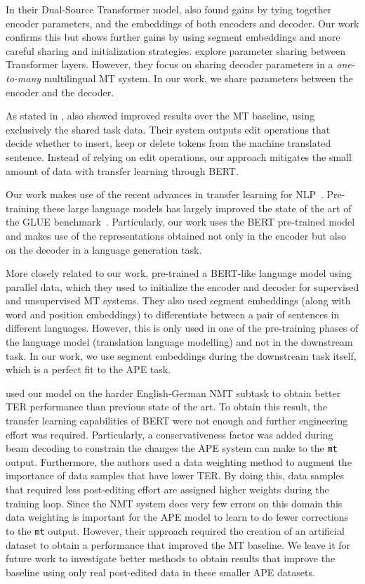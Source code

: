 In their Dual-Source Transformer model, \citet{junczys2018ms} also
found gains by tying together encoder parameters, and the embeddings
of both encoders and decoder. Our work confirms this but shows
further gains by using segment embeddings and more careful sharing
and initialization strategies. \citet{sachan2018parameter} explore
parameter sharing between Transformer layers. However, they focus on
sharing decoder parameters in a \emph{one-to-many} multilingual MT
system. In our work, we share parameters between the encoder and the
decoder.

As stated in , \citet{berard2017lig} also
showed improved results over the MT baseline, using exclusively the
shared task data. Their system outputs edit operations that decide
whether to insert, keep or delete tokens from the machine translated
sentence. Instead of relying on edit operations, our approach
mitigates the small amount of data with transfer learning through
BERT.

Our work makes use of the recent advances in transfer learning for
NLP~\citep{peters2018deep, howard2018universal, radford2018improving,
  devlin2018bert}. Pre-training these large language models has largely
improved the state of the art of the GLUE
benchmark~\citep{wang2018glue}. Particularly, our work uses the BERT
pre-trained model and makes use of the representations obtained not
only in the encoder but also on the decoder in a language generation
task.

More closely related to our work, \citet{lample2019cross}
pre-trained a BERT-like language model using parallel data, which
they used to initialize the encoder and decoder for supervised and
unsupervised MT systems. They also used segment embeddings (along
with word and position embeddings) to differentiate between a pair of
sentences in different languages. However, this is only used in one
of the pre-training phases of the language model (translation
language modelling) and not in the downstream task. In our work, we
use segment embeddings during the downstream task itself, which is a
perfect fit to the APE task.

\citet{lopes2019unbabels} used our model on the harder
English-German NMT subtask to obtain better TER performance than
previous state of the art. To obtain this result, the transfer
learning capabilities of BERT were not enough and further engineering
effort was required. Particularly, a conservativeness factor was
added during beam decoding to constrain the changes the APE system
can make to the {\tt mt} output. Furthermore, the authors used a data
weighting method to augment the importance of data samples that have
lower TER. By doing this, data samples that required less
post-editing effort are assigned higher weights during the training
loop. Since the NMT system does very few errors on this domain this
data weighting is important for the APE model to learn to do fewer
corrections to the {\tt mt} output. However, their approach required
the creation of an artificial dataset to obtain a performance that
improved the MT baseline. We leave it for future work to investigate
better methods to obtain results that improve the baseline using only
real post-edited data in these smaller APE datasets.

